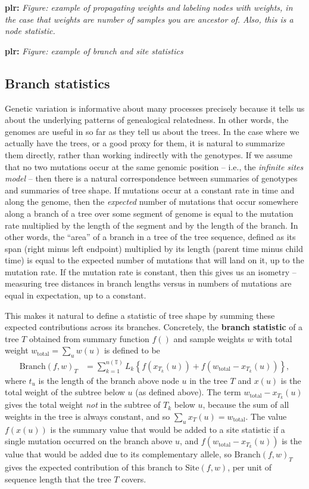 \documentclass{article}
\newcommand{\branch}{\mbox{Branch}} %
\newcommand{\site}{\mbox{Site}} %
\newcommand{\treeseq}{\mathbb{T}} %
\newcommand{\iw}{w} %
\newcommand{\tiw}{w_\text{total}} %
\newcommand{\nw}{x} %
\newcommand{\plr}[1]{{\color{blue}\textbf{plr:} \it #1}}
\begin{document}
\plr{Figure: example of propagating weights and labeling nodes with weights,
    in the case that weights are number of samples you are ancestor of.
    Also, this is a node statistic.}

\plr{Figure: example of branch and site statistics}


\subsection*{Branch statistics}

Genetic variation is informative about many processes
precisely because it tells us about the underlying patterns of genealogical relatedness.
In other words, the genomes are useful in so far as they tell us about the trees.
In the case where we actually have the trees, or a good proxy for them,
it is natural to summarize them directly, rather than working indirectly with the genotypes.
If we assume that no two mutations occur at the same genomic position --
i.e., the \emph{infinite sites model} --
then there is a natural correspondence between summaries of genotypes and summaries of tree shape.
If mutations occur at a constant rate in time and along the genome,
then the \emph{expected} number of mutations that occur somewhere along a branch of a tree
over some segment of genome
is equal to the mutation rate multiplied by the length of the segment and by the length of the branch.
In other words, the ``area'' of a branch in a tree of the tree sequence,
defined as its span (right minus left endpoint) multiplied by its length (parent time minus child time)
is equal to the expected number of mutations that will land on it, up to the mutation rate.
If the mutation rate is constant,
then this gives us an isometry --
measuring tree distances in branch lengths versus in numbers of mutations
are equal in expectation, up to a constant.

This makes it natural to define
a statistic of tree shape by summing these expected contributions across its branches.
Concretely, the \textbf{branch statistic} of a tree $T$
obtained from summary function $f()$
and sample weights $\iw$ with total weight $\tiw = \sum_u \iw(u)$
is defined to be
\begin{align}
    \branch(f, \iw)_T
    &=
    \sum_{k=1}^{n(\treeseq)} L_k \left\{ f(\nw_{T_k}(u)) + f(\tiw - \nw_{T_k}(u)) \right\}  ,
\end{align}
where $t_u$ is the length of the branch above node $u$ in the tree $T$
and $\nw(u)$ is the total weight of the subtree below $u$ (as defined above).
The term $\tiw - \nw_{T_k}(u)$ gives the total weight \emph{not} in the subtree of $T_k$ below $u$,
because the sum of all weights in the tree is always constant,
and so $\sum_u \nw_T(u) = \tiw$.
The value $f(\nw(u))$ is the summary value that would be added to a site statistic
if a single mutation occurred on the branch above $u$,
and $f(\tiw - \nw_{T_k}(u))$ is the value that would be added due to its complementary allele,
so $\branch(f, \iw)_T$ gives the expected contribution of this branch to $\site(f, \iw)$,
per unit of sequence length that the tree $T$ covers.
\end{document}

